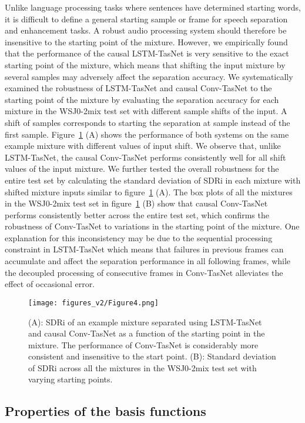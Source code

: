 \documentclass[journal]{IEEEtran}
\begin{document}
Unlike language processing tasks where sentences have determined starting words, it is difficult to define a general starting sample or frame for speech separation and enhancement tasks. A robust audio processing system should therefore be insensitive to the starting point of the mixture. However, we empirically found that the performance of the causal LSTM-TasNet is very sensitive to the exact starting point of the mixture, which means that shifting the input mixture by several samples may adversely affect the separation accuracy. We systematically examined the robustness of LSTM-TasNet and causal Conv-TasNet to the starting point of the mixture by evaluating the separation accuracy for each mixture in the WSJ0-2mix test set with different sample shifts of the input. A shift of  samples corresponds to starting the separation at sample  instead of the first sample. Figure~\ref{fig:shift} (A) shows the performance of both systems on the same example mixture with different values of input shift. We observe that, unlike LSTM-TasNet, the causal Conv-TasNet performs consistently well for all shift values of the input mixture. We further tested the overall robustness for the entire test set by calculating the standard deviation of SDRi in each mixture with shifted mixture inputs similar to figure~\ref{fig:shift} (A). The box plots of all the mixtures in the WSJ0-2mix test set in figure~\ref{fig:shift} (B) show that causal Conv-TasNet performs consistently better across the entire test set, which confirms the robustness of Conv-TasNet to variations in the starting point of the mixture. One explanation for this inconsistency may be due to the sequential processing constraint in LSTM-TasNet which means that failures in previous frames can accumulate and affect the separation performance in all following frames, while the decoupled processing of consecutive frames in Conv-TasNet alleviates the effect of occasional error.

\begin{figure}[!htp]
	\small
	\centering
	\texttt{[image: figures\_v2/Figure4.png]}
	\caption{(A): SDRi of an example mixture separated using LSTM-TasNet and causal Conv-TasNet as a function of the starting point in the mixture. The performance of Conv-TasNet is considerably more consistent and insensitive to the start point. (B): Standard deviation of SDRi across all the mixtures in the WSJ0-2mix test set with varying starting points.}
	\label{fig:shift}
\end{figure}

\subsection{Properties of the basis functions}
\label{sec:exp-basis}
\end{document}
